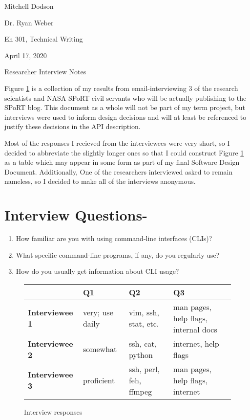 \documentclass[12pt]{article}
\begin{document}
Mitchell Dodson

Dr. Ryan Weber %

Eh 301, Technical Writing %

April 17, 2020 %

\begin{center}\large
Researcher Interview Notes
\end{center}

\noindent
Figure \ref{results} is a collection of my results from email-interviewing 3 of the research scientists and NASA SPoRT civil servants who will be actually publishing to the SPoRT blog. This document as a whole will not be part of my term project, but interviews were used to inform design decisions and will at least be referenced to justify these decisions in the API description.

Most of the responses I recieved from the interviewees were very short, so I decided to abbreviate the slightly longer ones so that I could construct Figure \ref{results} as a table which may appear in some form as part of my final Software Design Document. Additionally, One of the researchers interviewed asked to remain nameless, so I decided to make all of the interviews anonymous.

\section{Interview Questions-}

\begin{enumerate}
  \item{How familiar are you with using command-line interfaces (CLIs)?}
  \item{What specific command-line programs, if any, do you regularly use?}
  \item{How do you usually get information about CLI usage?}
\end{enumerate}

\vspace{2em}
\begin{figure}[h]
  \centering
  \begin{tabular}{l | l | l | l }
     & \textbf{Q1} & \textbf{Q2} & \textbf{Q3} \\\hline
    \textbf{Interviewee 1} & very; use daily & vim, ssh, stat, etc.  & man pages, help flags, internal docs \\
    \textbf{Interviewee 2} & somewhat & ssh, cat, python & internet, help flags \\
    \textbf{Interviewee 3} & proficient & ssh, perl, feh, ffmpeg & man pages, help flags, internet\\
  \end{tabular}
  \caption{Interview responses}
  \label{results}
\end{figure}




\printbibliography
\end{document}
